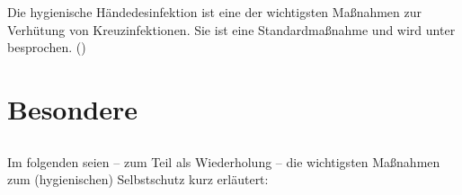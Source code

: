 {Die hygienische Händedesinfektion ist eine der wichtigsten
Maßnahmen zur Verhütung von Kreuzinfektionen. Sie ist eine
Standardmaßnahme und wird unter 
besprochen.}
{\CO{[SAN]}
()}{}{}{}









\section{Besondere }





\subsection{}

Im folgenden seien -- zum Teil als Wiederholung -- die wichtigsten Maßnahmen
zum (hygienischen) Selbstschutz kurz erläutert:


